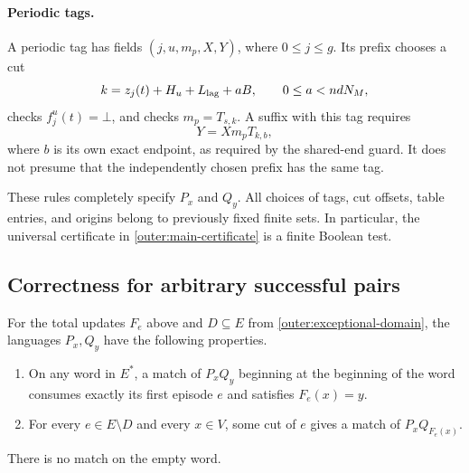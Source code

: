 \paragraph{Periodic tags.}
A periodic tag has fields $(j,u,m_p,X,Y)$, where $0\le j\le g$.
Its prefix chooses a cut
\[
 k=z_j(t)+H_u+L_{\rm lag}+aB,\qquad 0\le a<n d N_M,
\]
checks $f_j^u(t)=\bot$, and checks $m_p=T_{s,k}$.
A suffix with this tag requires
\begin{equation}
                       Y=X m_p T_{k,b},
 \label{outer:periodic-certificate}
\end{equation}
where $b$ is its own exact endpoint, as required by the shared-end
guard.  It does not presume that the independently chosen prefix
has the same tag.

These rules completely specify $P_x$ and $Q_y$.  All choices of
tags, cut offsets, table entries, and origins belong to previously
fixed finite sets.  In particular, the universal certificate in
\eqref{outer:main-certificate} is a finite Boolean test.

\subsection{Correctness for arbitrary successful pairs}

\begin{proposition}\label{outer:split}
For the total updates $F_e$ above and $D\subseteq E$ from
\eqref{outer:exceptional-domain}, the languages $P_x,Q_y$ have the
following properties.
\begin{enumerate}
\item On any word in $E^*$, a match of $P_xQ_y$ beginning at the
      beginning of the word consumes exactly its first episode $e$
      and satisfies $F_e(x)=y$.
\item For every $e\in E\setminus D$ and every $x\in V$, some cut
      of $e$ gives a match of $P_xQ_{F_e(x)}$.
\end{enumerate}
There is no match on the empty word.
\end{proposition}

